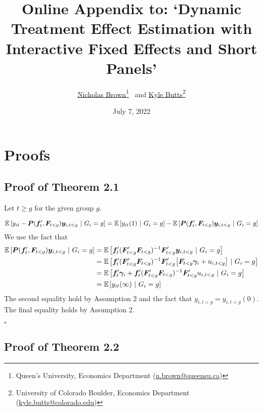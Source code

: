 \documentclass[12pt]{article}
\title{Online Appendix to: `Dynamic Treatment Effect Estimation with Interactive Fixed Effects and Short Panels'}
\author{%
\href{https://sites.google.com/msu.edu/nicholasbrown}{Nicholas Brown}\thanks{Queen's University, Economics Department (\href{mailto:n.brown@queensu.ca}{n.brown@queensu.ca})}
\ and 
\href{https://kylebutts.com/}{Kyle Butts}\thanks{University of Colorado Boulder, Economics Department (\href{mailto:kyle.butts@colorado.edu}{kyle.butts@colorado.edu})}}
\date{July 7, 2022}
\begin{document}
\maketitle
\appendix

\renewcommand{\theequation}{\thesection.\arabic{equation}}
\renewcommand{\thetheorem}{\thesection. \arabic{theorem}}

\section{Proofs}\label{sec:proofs}



\subsection*{Proof of Theorem 2.1}

Let $t \geq g$ for the given group $g$.

\begin{equation*}
    \mathbb{E}\left[y_{it} - \bm P(\bm f_{t}', \bm F_{t < g}) \bm y_{i,t < g} \ \vert \ G_i = g\right] = \mathbb{E}\left[y_{it}(1) \ \vert \ G_i = g\right] - \mathbb{E}\left[\bm P(\bm f_{t}', \bm F_{t < g}) \bm y_{i,t < g} \ \vert \ G_i = g\right] 
\end{equation*}
We use the fact that 
\begin{align*}
    \mathbb{E}\left[ \bm P(\bm f_{t}', \bm F_{t < g}) \bm y_{i,t < g}  \ \vert \ G_i = g\right] 
    &= \mathbb{E}\left[ \bm f_{t}' (\bm F_{t < g}' \bm F_{t < g})^{-1} \bm F_{t < g}' \bm y_{i,t < g}  \ \vert \ G_i = g\right] \\
    &= \mathbb{E}\left[ \bm f_{t}' (\bm F_{t < g}' \bm F_{t < g})^{-1} \bm F_{t < g}' \big[\bm F_{t < g} \bm \gamma_i + u_{i,t < g} \big]  \ \vert \ G_i = g\right] \\
    &= \mathbb{E}\left[ \bm f_{t}' \bm \gamma_i + \bm f_{t}' (\bm F_{t < g}' \bm F_{t < g})^{-1} \bm F_{t < g}' u_{i,t < g}  \ \vert \ G_i = g\right] \\
    &= \mathbb{E}\left[ y_{it}(\infty)  \ \vert \ G_i = g\right] 
\end{align*}
The second equality hold by Assumption 2 and the fact that $y_{i,t < g} = y_{i, t < g}(0)$. The final equality holds by Assumption 2.

$\square$




\subsection*{Proof of Theorem 2.2}
\end{document}
